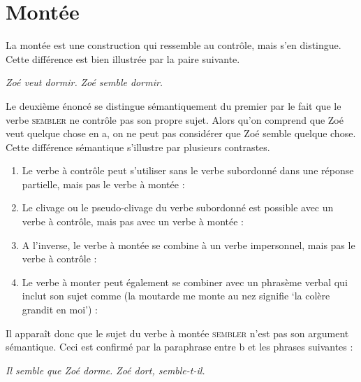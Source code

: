 \section{Montée}
\label{sec:13-montee}
La montée est une construction qui ressemble au contrôle, mais s’en distingue. Cette différence est bien illustrée par la paire suivante.

\ea\label{ex:13-dormir}
\ea \textit{Zoé veut dormir.}
\ex \textit{Zoé semble dormir.}\z\z

Le deuxième énoncé se distingue sémantiquement du premier par le fait que le verbe \textsc{sembler} ne contrôle pas son propre sujet. Alors qu’on comprend que Zoé veut quelque chose en a, on ne peut pas considérer que Zoé semble quelque chose. Cette différence sémantique s’illustre par plusieurs contrastes.

\begin{enumerate}[label=(\arabic*)]
\item	Le verbe à contrôle peut s’utiliser sans le verbe subordonné dans une réponse partielle, mais pas le verbe à montée :
\ea{}
\z\z

\item	Le clivage ou le pseudo-clivage du verbe subordonné est possible avec un verbe à contrôle, mais pas avec un verbe à montée :
\ea{}
\z\z

\item	A l’inverse, le verbe à montée se combine à un verbe impersonnel, mais pas le verbe à contrôle :
\ea{}
\z\z

\item	Le verbe à monter peut également se combiner avec un phrasème verbal qui inclut son sujet comme  (la moutarde me monte au nez signifie ‘la colère grandit en moi’) :
\ea{}
\z\z

\end{enumerate}

Il apparaît donc que le sujet du verbe à montée \textsc{sembler} n’est pas son argument sémantique. Ceci est confirmé par la paraphrase entre b et les phrases suivantes :

\ea\ea \textit{Il semble que Zoé dorme.}
\ex \textit{Zoé dort, semble-t-il.}\z\z

